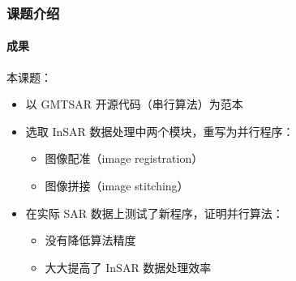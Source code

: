 \documentclass{beamer}
\begin{document}
\begin{frame}
    \frametitle{课题介绍}
    \framesubtitle{成果}

    本课题：
    \begin{itemize}
        \item 以 GMTSAR 开源代码（串行算法）为范本
        \item 选取 InSAR 数据处理中两个模块，重写为并行程序：
        \begin{itemize}
            \item 图像配准（image registration）
            \item 图像拼接（image stitching）
        \end{itemize}
        \item 在实际 SAR 数据上测试了新程序，证明并行算法：
        \begin{itemize}
            \item 没有降低算法精度
            \item 大大提高了 InSAR 数据处理效率
        \end{itemize}
    \end{itemize}
\end{frame}
\end{document}
